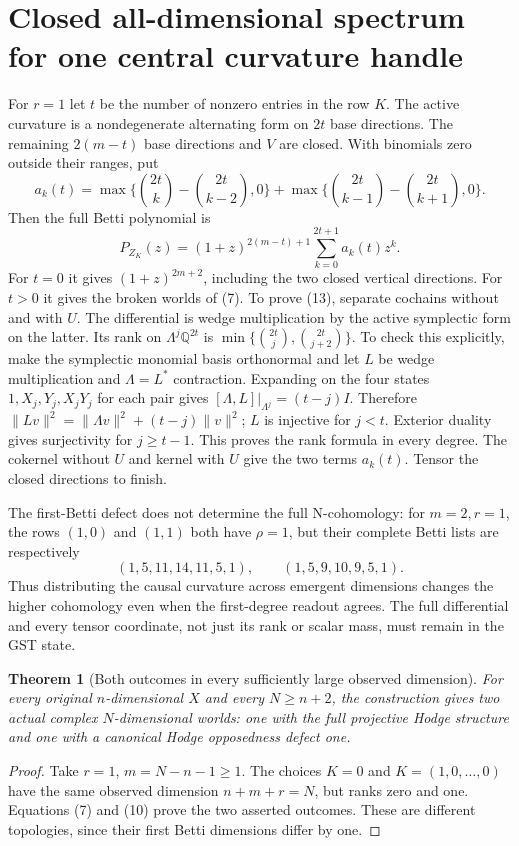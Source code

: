 \documentclass[11pt]{article}
\newtheorem{theorem}{Theorem}
\newcommand{\Q}{\mathbb Q}
\begin{document}
\section{Closed all-dimensional spectrum for one central curvature handle}
For $r=1$ let $t$ be the number of nonzero entries in the row $K$.
The active curvature is a nondegenerate alternating form on $2t$ base
directions. The remaining $2(m-t)$ base directions and $V$ are closed.
With binomials zero outside their ranges, put
\[
 a_k(t)=\max\{\binom{2t}k-\binom{2t}{k-2},0\}
       +\max\{\binom{2t}{k-1}-\binom{2t}{k+1},0\}.
\]
Then the full Betti polynomial is
\[
 P_{Z_K}(z)=(1+z)^{2(m-t)+1}
                   \sum_{k=0}^{2t+1}a_k(t)z^k.        \tag{13}
\]
For $t=0$ it gives $(1+z)^{2m+2}$, including the two closed vertical
directions. For $t>0$ it gives the broken worlds of (7).
To prove (13), separate cochains without and with $U$. The differential
is wedge multiplication by the active symplectic form on the latter.
Its rank on $\Lambda^j\Q^{2t}$ is
$\min\{\binom{2t}j,\binom{2t}{j+2}\}$. To check this explicitly, make
the symplectic monomial basis orthonormal and let $L$ be wedge multiplication
and $\Lambda=L^*$ contraction. Expanding on the four states
$1,X_j,Y_j,X_jY_j$ for each pair gives
$[\Lambda,L]|_{\Lambda^j}=(t-j)I$. Therefore
$\|Lv\|^2=\|\Lambda v\|^2+(t-j)\|v\|^2$; $L$ is injective for $j<t$.
Exterior duality gives surjectivity for $j\geq t-1$. This proves the
rank formula in every degree. The cokernel without $U$ and kernel with $U$
give the two terms $a_k(t)$. Tensor the closed directions to finish.

The first-Betti defect does not determine the full N-cohomology:
for $m=2,r=1$, the rows $(1,0)$ and $(1,1)$ both have $\rho=1$, but
their complete Betti lists are respectively
\[
 (1,5,11,14,11,5,1),\qquad(1,5,9,10,9,5,1).            \tag{14}
\]
Thus distributing the causal curvature across emergent dimensions changes
the higher cohomology even when the first-degree readout agrees. The
full differential and every tensor coordinate, not just its rank or
scalar mass, must remain in the GST state.

\begin{theorem}[Both outcomes in every sufficiently large observed dimension]
For every original $n$-dimensional $X$ and every $N\geq n+2$, the construction
gives two actual complex $N$-dimensional worlds: one with the full projective
Hodge structure and one with a canonical Hodge opposedness defect one.
\end{theorem}
\begin{proof}
Take $r=1$, $m=N-n-1\geq1$. The choices $K=0$ and $K=(1,0,\ldots,0)$
have the same observed dimension $n+m+r=N$, but ranks zero and one.
Equations (7) and (10) prove the two asserted outcomes. These are different
topologies, since their first Betti dimensions differ by one.
\end{proof}
\end{document}
